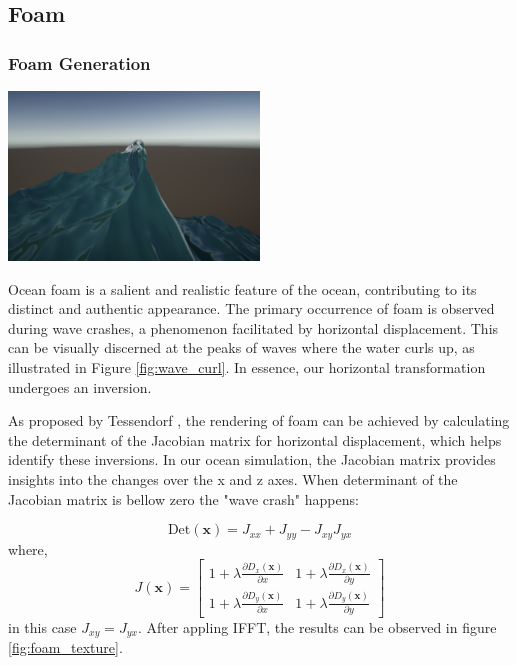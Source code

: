\subsection{Foam}
\subsubsection{Foam Generation}
\begin{minipage}{1\textwidth}
    \centering
    \includegraphics[width=0.50\textwidth]{"images/wave_curl.png"}
    \label{fig:wave_curl}
\end{minipage}

Ocean foam is a salient and realistic feature of the ocean, contributing to its distinct and authentic appearance. The primary occurrence of foam is observed during wave crashes, a phenomenon facilitated by horizontal displacement. This can be visually discerned at the peaks of waves where the water curls up, as illustrated in Figure \ref{fig:wave_curl}. In essence, our horizontal transformation undergoes an inversion.

As proposed by Tessendorf \cite{tessendorf2001}, the rendering of foam can be achieved by calculating the determinant of the Jacobian matrix for horizontal displacement, which helps identify these inversions. In our ocean simulation, the Jacobian matrix provides insights into the changes over the x and z axes. When determinant of the Jacobian matrix is bellow zero the "wave crash" happens:

\begin{equation}
    \text{Det}(\mathbf{x}) = J_{xx} + J_{yy} - J_{xy} J_{yx}
\end{equation}
where,
\begin{equation}
    J(\mathbf{x}) = 
    \begin{bmatrix} 
        1 + \lambda\frac{\partial D_x(\mathbf{x})}{\partial x} & 1 + \lambda\frac{\partial D_x(\mathbf{x})}{\partial y} \\
        1 + \lambda\frac{\partial D_y(\mathbf{x})}{\partial x} & 1 + \lambda\frac{\partial D_y(\mathbf{x})}{\partial y} 
    \end{bmatrix} 
\end{equation}
in this case $J_{xy} = J_{yx}$. After appling IFFT, the results can be observed in figure \ref{fig:foam_texture}.

